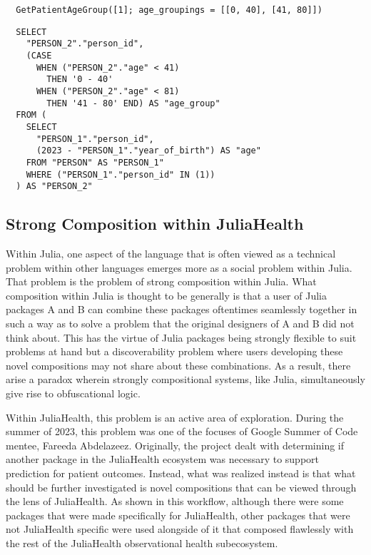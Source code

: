 \documentclass{juliacon}
\begin{document}
\begin{verbatim}
  GetPatientAgeGroup([1]; age_groupings = [[0, 40], [41, 80]])
\end{verbatim}

\begin{verbatim}
  SELECT
    "PERSON_2"."person_id",
    (CASE 
      WHEN ("PERSON_2"."age" < 41) 
        THEN '0 - 40' 
      WHEN ("PERSON_2"."age" < 81) 
        THEN '41 - 80' END) AS "age_group"
  FROM (
    SELECT
      "PERSON_1"."person_id",
      (2023 - "PERSON_1"."year_of_birth") AS "age"
    FROM "PERSON" AS "PERSON_1"
    WHERE ("PERSON_1"."person_id" IN (1))
  ) AS "PERSON_2"
\end{verbatim}


\subsection{Strong Composition within JuliaHealth}

Within Julia, one aspect of the language that is often viewed as a technical problem within other languages emerges more as a social problem within Julia.
That problem is the problem of strong composition within Julia.
What composition within Julia is thought to be generally is that a user of Julia packages A and B can combine these packages oftentimes seamlessly together in such a way as to solve a problem that the original designers of A and B did not think about.
This has the virtue of Julia packages being strongly flexible to suit problems at hand but a discoverability problem where users developing these novel compositions may not share about these combinations.
As a result, there arise a paradox wherein strongly compositional systems, like Julia, simultaneously give rise to obfuscational logic.

Within JuliaHealth, this problem is an active area of exploration.
During the summer of 2023, this problem was one of the focuses of Google Summer of Code mentee, Fareeda Abdelazeez.
Originally, the project dealt with determining if another package in the JuliaHealth ecosystem was necessary to support prediction for patient outcomes.
Instead, what was realized instead is that what should be further investigated is novel compositions that can be viewed through the lens of JuliaHealth.
As shown in this workflow, although there were some packages that were made specifically for JuliaHealth, other packages that were not JuliaHealth specific were used alongside of it that composed flawlessly with the rest of the JuliaHealth observational health subecosystem.
\end{document}
